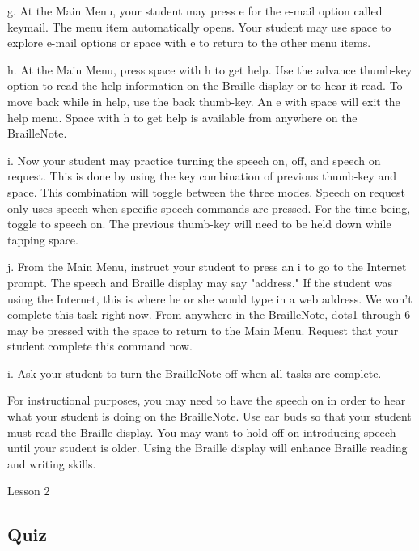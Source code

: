\documentclass[10pt,letterpaper,twoside]{report}
\begin{document}
{{{{g. At the Main Menu, your student may press e for the e-mail option called keymail.  The menu item automatically opens.  Your student may use space to explore e-mail options or space with e to return to the other menu items.



h. At the Main Menu, press space with h to get help.  Use the advance thumb-key option to read the help information on the Braille display or to hear it read.  To move back while in help, use the back thumb-key.  An e with space will exit the help menu.  Space with h to get help is available from anywhere on the BrailleNote.



i. Now your student may practice turning the speech on, off, and speech on request.  This is done by using the key combination of previous thumb-key and space.  This combination will toggle between the three modes.  Speech on request only uses speech when specific speech commands are pressed.  For the time being, toggle to speech on.  The previous thumb-key will need to be held down while tapping space.



j. From the Main Menu, instruct your student to press an i to go to the Internet prompt.  The speech and Braille display may say "address." If the student was using the Internet, this is where he or she would type in a web address.  We won't complete this task right now.  From anywhere in the BrailleNote, dots1 through 6 may be pressed with the space to return to the Main Menu.  Request that your student complete this command now.



i. Ask your student to turn the BrailleNote off when all tasks are complete.



For instructional purposes, you may need to have the speech on in order to hear what your student is doing on the BrailleNote. Use ear buds so that your student must read the Braille display. You may want to hold off on introducing speech until your student is older. Using the Braille display will enhance Braille reading and writing skills.



\clearpage

\newpage
Lesson 2

\subsection{Quiz}



}}}}
\end{document}
